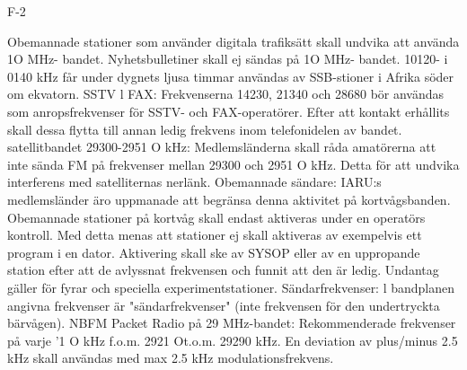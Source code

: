F-2

Obemannade stationer som använder digitala trafiksätt
skall undvika att använda 1O MHz- bandet.
Nyhetsbulletiner skall ej sändas på 1O MHz- bandet.
10120- i 0140 kHz får under dygnets ljusa timmar användas av SSB-stioner i Afrika söder om ekvatorn.
SSTV l FAX:
Frekvenserna 14230, 21340 och 28680 bör användas
som anropsfrekvenser för SSTV- och FAX-operatörer.
Efter att kontakt erhållits skall dessa flytta till annan
ledig frekvens inom telefonidelen av bandet.
satellitbandet 29300-2951 O kHz:
Medlemsländerna skall råda amatörerna att inte sända
FM på frekvenser mellan 29300 och 2951 O kHz. Detta
för att undvika interferens med satelliternas nerlänk.
Obemannade sändare:
IARU:s medlemsländer äro uppmanade att begränsa
denna aktivitet på kortvågsbanden.
Obemannade stationer på kortvåg skall endast aktiveras under en operatörs kontroll.
Med detta menas att stationer ej skall aktiveras av
exempelvis ett program i en dator. Aktivering skall ske
av SYSOP eller av en uppropande station efter att de
avlyssnat frekvensen och funnit att den är ledig.
Undantag gäller för fyrar och speciella experimentstationer.
Sändarfrekvenser:
l bandplanen angivna frekvenser är "sändarfrekvenser"
(inte frekvensen för den undertryckta bärvågen).
NBFM Packet Radio på 29 MHz-bandet:
Rekommenderade frekvenser på varje '1 O kHz f.o.m.
2921 Ot.o.m. 29290 kHz. En deviation av plus/minus 2.5
kHz skall användas med max 2.5 kHz modulationsfrekvens.
